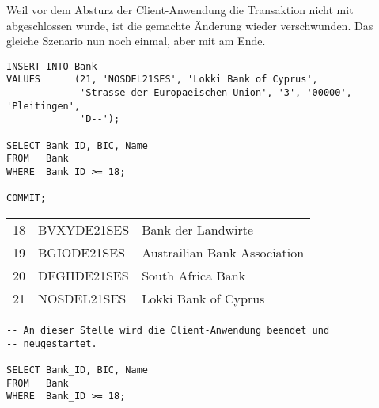 Weil vor dem Absturz der Client-Anwendung die Transaktion nicht mit
\COMMIT{} abgeschlossen wurde, ist die gemachte Änderung wieder
verschwunden. Das gleiche Szenario nun noch einmal, aber mit \COMMIT{}
am Ende.
\begin{lstlisting}[language=oracle_sql,label=sql07_26]
INSERT INTO Bank
VALUES      (21, 'NOSDEL21SES', 'Lokki Bank of Cyprus',
             'Strasse der Europaeischen Union', '3', '00000', 'Pleitingen',
             'D--');

SELECT Bank_ID, BIC, Name
FROM   Bank
WHERE  Bank_ID >= 18;

COMMIT;
          \end{lstlisting}
\begin{center}
    \begin{small}
        \tablehead{}
        \tabletail {
        }
        \begin{msoraclesql}
            \begin{supertabular}{rll}
                18 & BVXYDE21SES & Bank der Landwirte \\
                19 & BGIODE21SES & Austrailian Bank Association \\
                20 & DFGHDE21SES & South Africa Bank \\
                21 & NOSDEL21SES & Lokki Bank of Cyprus  \\
            \end{supertabular}
        \end{msoraclesql}
    \end{small}
\end{center}
\clearpage
\begin{lstlisting}[language=oracle_sql,label=sql07_27]
-- An dieser Stelle wird die Client-Anwendung beendet und
-- neugestartet.

SELECT Bank_ID, BIC, Name
FROM   Bank
WHERE  Bank_ID >= 18;
          \end{lstlisting}
